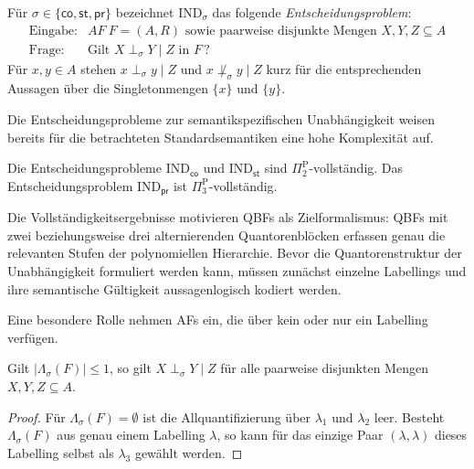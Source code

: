 \begin{Definition}
    \label{def:sigma-independence-af-dec-problem}
    Für \(\sigma\in\{\mathsf{co},\mathsf{st},\mathsf{pr}\}\) bezeichnet
    \(\mathrm{IND}_\sigma\) das folgende \emph{Entscheidungsproblem}:
    \[
        \begin{array}{ll}
        \text{Eingabe:}
            &AF~F =(A,R)\text{ sowie paarweise disjunkte Mengen }
             X,Y,Z\subseteq A\\
        \text{Frage:}
            &\text{Gilt }X\perp_\sigma Y\mid Z\text{ in }F\,?
        \end{array}
    \]
    Für \(x,y\in A\) stehen
    \(x\perp_\sigma y\mid Z\) und
    \(x\not\perp_\sigma y\mid Z\) kurz für die entsprechenden Aussagen
    über die Singletonmengen \(\{x\}\) und \(\{y\}\).
\end{Definition}


Die Entscheidungsprobleme zur semantikspezifischen Unabhängigkeit weisen
bereits für die betrachteten Standardsemantiken eine hohe Komplexität auf.

\begin{Theorem}
\label{thm:independence-complexity}
Die Entscheidungsprobleme
\(\mathrm{IND}_{\mathsf{co}}\) und
\(\mathrm{IND}_{\mathsf{st}}\) sind
\(\Pi^{\mathrm P}_2\)-vollständig.
Das Entscheidungsproblem
\(\mathrm{IND}_{\mathsf{pr}}\) ist
\(\Pi^{\mathrm P}_3\)-vollständig.
\end{Theorem}

Die Vollständigkeitsergebnisse motivieren QBFs als Zielformalismus:
QBFs mit zwei beziehungsweise drei alternierenden Quantorenblöcken
erfassen genau die relevanten Stufen der polynomiellen Hierarchie. Bevor
die Quantorenstruktur der Unabhängigkeit formuliert werden kann, müssen
zunächst einzelne Labellings und ihre semantische Gültigkeit
aussagenlogisch kodiert werden.

Eine besondere Rolle nehmen AFs ein, die über kein oder nur ein Labelling verfügen.

\begin{Lemma}
    \label{lem:independence-trivial-labelling-set}
    Gilt \(|\Lambda_\sigma(F)|\leq 1\), so gilt
    \(X\perp_\sigma Y\mid Z\) für alle paarweise disjunkten Mengen
    \(X,Y,Z\subseteq A\).
\end{Lemma}

\begin{proof}
    Für \(\Lambda_\sigma(F)=\emptyset\) ist die Allquantifizierung über
    \(\lambda_1\) und \(\lambda_2\) leer. Besteht
    \(\Lambda_\sigma(F)\) aus genau einem Labelling \(\lambda\), so kann
    für das einzige Paar \((\lambda,\lambda)\) dieses Labelling selbst als
    \(\lambda_3\) gewählt werden.
\end{proof}

